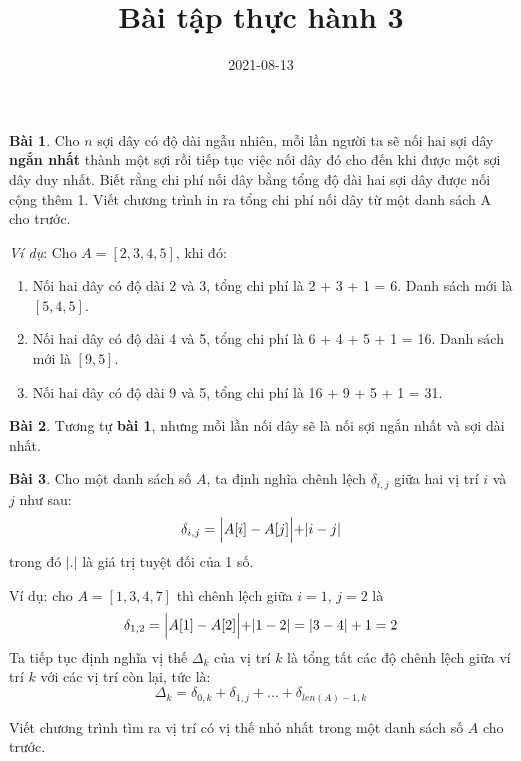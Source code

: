 \documentclass[12pt, a4paper]{article}
\title{Bài tập thực hành 3}
\date{2021-08-13}
\author{}
\begin{document}
    \onehalfspacing
    \maketitle
    \textbf{Bài 1}. Cho $n$ sợi dây có độ dài ngẫu nhiên, mỗi lần người ta sẽ nối hai sợi dây \textbf{ngắn nhất}
    thành một sợi rồi tiếp tục việc nối dây đó cho đến khi được một sợi dây duy nhất. 
    Biết rằng chi phí nối dây bằng tổng độ dài hai sợi dây được nối cộng thêm 1. 
    Viết chương trình in ra tổng chi phí nối dây từ một danh sách A cho trước.
    
    \textit{Ví dụ}: Cho $A = [2, 3, 4, 5]$, khi đó:
    \begin{enumerate}
        \item Nối hai dây có độ dài 2 và 3, tổng chi phí là 2 + 3 + 1 = 6. Danh sách mới là $[5, 4, 5]$.
        \item Nối hai dây có độ dài 4 và 5, tổng chi phí là 6 + 4 + 5 + 1 = 16. Danh sách mới là $[9, 5]$.
        \item Nối hai dây có độ dài 9 và 5, tổng chi phí là 16 + 9 + 5 + 1 = 31.
    \end{enumerate}

    \textbf{Bài 2}. Tương tự \textbf{bài 1}, nhưng mỗi lần nối dây sẽ là nối sợi ngắn nhất và sợi dài nhất.
    
    \textbf{Bài 3}.  Cho một danh sách số $A$, ta định nghĩa chênh lệch $\delta_{i,j}$ giữa hai vị trí $i$ và $j$ như sau:
    $$\delta_{i,j} = \Bigl|A[i]-A[j]\Bigl| + |i-j|$$
    trong đó $|.|$ là giá trị tuyệt đối của 1 số.

    Ví dụ: cho $A = [1, 3, 4, 7]$ thì chênh lệch giữa $i = 1$, $j = 2$ là 
    $$\delta_{1,2} = \Bigl|A[1]-A[2]\Bigl| + |1-2| = |3-4| + 1 = 2$$
    Ta tiếp tục định nghĩa vị thế $\Delta_k$ của vị trí $k$ 
    là tổng tất các độ chênh lệch giữa ví trí $k$ với các vị trí còn lại, tức là:
    $$\Delta_k = \delta_{0,k} + \delta_{1,j} + ... + \delta_{len(A)-1, k}$$

    Viết chương trình tìm ra vị trí có vị thế nhỏ nhất trong một danh sách số $A$ cho trước.
\end{document}
